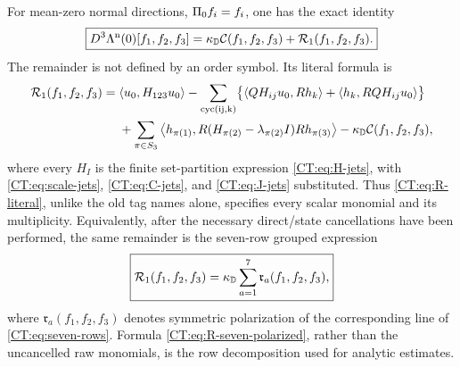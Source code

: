\begin{theorem}
\label{CT:thm:complete-split}
For mean-zero normal directions, $\Pi_0 f_i=f_i$, one has the exact
identity
\begin{equation}\label{CT:eq:complete-split}
 \boxed{
 D^3\Lambda^{\rm n}(0)[f_1,f_2,f_3]
 =\kappa_{\mathbb D}\mathcal C(f_1,f_2,f_3)
  +\mathcal R_1(f_1,f_2,f_3).}
\end{equation}
The remainder is not defined by an order symbol.  Its literal formula is
\begin{align}
 \mathcal R_1(f_1,f_2,f_3)={}&
 \langle u_0,H_{123}u_0\rangle
 -\sum_{\rm cyc(ij,k)}
 \bigl\{\langle QH_{ij}u_0,Rh_k\rangle
        +\langle h_k,RQH_{ij}u_0\rangle\bigr\}
 \notag\\
 &+\sum_{\pi\in S_3}
 \left\langle h_{\pi(1)},
 R(H_{\pi(2)}-\lambda_{\pi(2)}I)R
 h_{\pi(3)}\right\rangle
 -\kappa_{\mathbb D}\mathcal C(f_1,f_2,f_3),
 \label{CT:eq:R-literal}
\end{align}
where every $H_I$ is the finite set-partition expression
\eqref{CT:eq:H-jets}, with \eqref{CT:eq:scale-jets}, \eqref{CT:eq:C-jets}, and
\eqref{CT:eq:J-jets} substituted.  Thus \eqref{CT:eq:R-literal}, unlike the old
tag names alone, specifies every scalar monomial and its multiplicity.
Equivalently, after the necessary direct/state cancellations have been
performed, the same remainder is the seven-row grouped expression
\begin{equation}\label{CT:eq:R-seven-polarized}
 \boxed{\mathcal R_1(f_1,f_2,f_3)
 =\kappa_{\mathbb D}\sum_{a=1}^7
   \mathfrak r_a(f_1,f_2,f_3),}
\end{equation}
where $\mathfrak r_a(f_1,f_2,f_3)$ denotes symmetric polarization of the
corresponding line of \eqref{CT:eq:seven-rows}.  Formula
\eqref{CT:eq:R-seven-polarized}, rather than the uncancelled raw monomials, is
the row decomposition used for analytic estimates.


\end{theorem}
